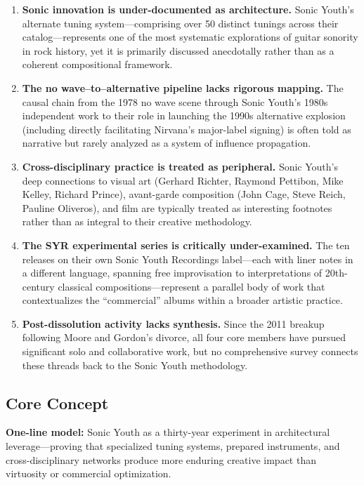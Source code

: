 \documentclass[11pt,letterpaper]{article}
\begin{document}
\begin{enumerate}[leftmargin=2em]
\item \textbf{Sonic innovation is under-documented as architecture.} Sonic Youth's alternate tuning system---comprising over 50 distinct tunings across their catalog---represents one of the most systematic explorations of guitar sonority in rock history, yet it is primarily discussed anecdotally rather than as a coherent compositional framework.
\item \textbf{The no wave--to--alternative pipeline lacks rigorous mapping.} The causal chain from the 1978 no wave scene through Sonic Youth's 1980s independent work to their role in launching the 1990s alternative explosion (including directly facilitating Nirvana's major-label signing) is often told as narrative but rarely analyzed as a system of influence propagation.
\item \textbf{Cross-disciplinary practice is treated as peripheral.} Sonic Youth's deep connections to visual art (Gerhard Richter, Raymond Pettibon, Mike Kelley, Richard Prince), avant-garde composition (John Cage, Steve Reich, Pauline Oliveros), and film are typically treated as interesting footnotes rather than as integral to their creative methodology.
\item \textbf{The SYR experimental series is critically under-examined.} The ten releases on their own Sonic Youth Recordings label---each with liner notes in a different language, spanning free improvisation to interpretations of 20th-century classical compositions---represent a parallel body of work that contextualizes the ``commercial'' albums within a broader artistic practice.
\item \textbf{Post-dissolution activity lacks synthesis.} Since the 2011 breakup following Moore and Gordon's divorce, all four core members have pursued significant solo and collaborative work, but no comprehensive survey connects these threads back to the Sonic Youth methodology.
\end{enumerate}

\subsection{Core Concept}

\textbf{One-line model:} Sonic Youth as a thirty-year experiment in architectural leverage---proving that specialized tuning systems, prepared instruments, and cross-disciplinary networks produce more enduring creative impact than virtuosity or commercial optimization.
\end{document}
